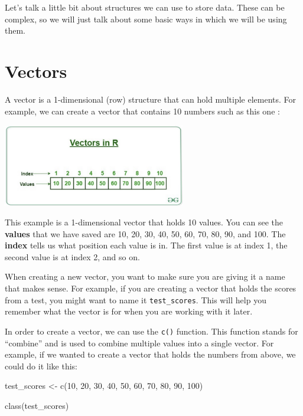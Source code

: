 \documentclass[
  letterpaper,
  DIV=11,
  numbers=noendperiod]{scrreprt}
\newenvironment{Shaded}{\begin{snugshade}}{\end{snugshade}}
\newcommand{\DecValTok}[1]{\textcolor[rgb]{0.68,0.00,0.00}{#1}}
\newcommand{\FunctionTok}[1]{\textcolor[rgb]{0.28,0.35,0.67}{#1}}
\newcommand{\NormalTok}[1]{\textcolor[rgb]{0.00,0.23,0.31}{#1}}
\newcommand{\OtherTok}[1]{\textcolor[rgb]{0.00,0.23,0.31}{#1}}
\begin{document}

Let's talk a little bit about structures we can use to store data. These
can be complex, so we will just talk about some basic ways in which we
will be using them.

\section*{Vectors}\label{vectors}


A vector is a 1-dimensional (row) structure that can hold multiple
elements. For example, we can create a vector that contains 10 numbers
such as this one :

\includegraphics[width=0.6\textwidth,height=\textheight]{./images/Vector-1.jpg}

This example is a 1-dimensional vector that holds 10 values. You can see
the \textbf{values} that we have saved are 10, 20, 30, 40, 50, 60, 70,
80, 90, and 100. The \textbf{index} tells us what position each value is
in. The first value is at index 1, the second value is at index 2, and
so on.

When creating a new vector, you want to make sure you are giving it a
name that makes sense. For example, if you are creating a vector that
holds the scores from a test, you might want to name it
\texttt{test\_scores}. This will help you remember what the vector is
for when you are working with it later.

In order to create a vector, we can use the \texttt{c()} function. This
function stands for ``combine'' and is used to combine multiple values
into a single vector. For example, if we wanted to create a vector that
holds the numbers from above, we could do it like this:

\begin{Shaded}
\begin{Highlighting}[]
\NormalTok{test\_scores }\OtherTok{\textless{}{-}} \FunctionTok{c}\NormalTok{(}\DecValTok{10}\NormalTok{, }\DecValTok{20}\NormalTok{, }\DecValTok{30}\NormalTok{, }\DecValTok{40}\NormalTok{, }\DecValTok{50}\NormalTok{, }\DecValTok{60}\NormalTok{, }\DecValTok{70}\NormalTok{, }\DecValTok{80}\NormalTok{, }\DecValTok{90}\NormalTok{, }\DecValTok{100}\NormalTok{)}

\FunctionTok{class}\NormalTok{(test\_scores)}
\end{Highlighting}
\end{Shaded}
\end{document}
